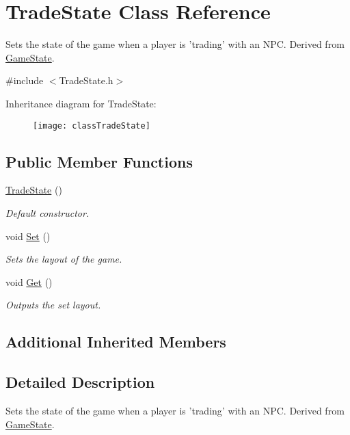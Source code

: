 \hypertarget{classTradeState}{\section{Trade\-State Class Reference}
\label{classTradeState}
}


Sets the state of the game when a player is 'trading' with an N\-P\-C. Derived from \hyperlink{classGameState}{Game\-State}.  




{\ttfamily \#include $<$Trade\-State.\-h$>$}

Inheritance diagram for Trade\-State\-:\begin{figure}[H]
\begin{center}
\leavevmode
\texttt{[image: classTradeState]}
\end{center}
\end{figure}
\subsection*{Public Member Functions}
\begin{DoxyCompactItemize}
\item 
\hyperlink{classTradeState_a1778870265717d50054d29be886b27d4}{Trade\-State} ()
\begin{DoxyCompactList}\small\item\em Default constructor. \end{DoxyCompactList}\item 
void \hyperlink{classTradeState_af0d9fdcd649c1e74620dc77a4b8f92f9}{Set} ()
\begin{DoxyCompactList}\small\item\em Sets the layout of the game. \end{DoxyCompactList}\item 
void \hyperlink{classTradeState_a6479e704b1063281721200a0beac6bc1}{Get} ()
\begin{DoxyCompactList}\small\item\em Outputs the set layout. \end{DoxyCompactList}\end{DoxyCompactItemize}
\subsection*{Additional Inherited Members}


\subsection{Detailed Description}
Sets the state of the game when a player is 'trading' with an N\-P\-C. Derived from \hyperlink{classGameState}{Game\-State}. 

